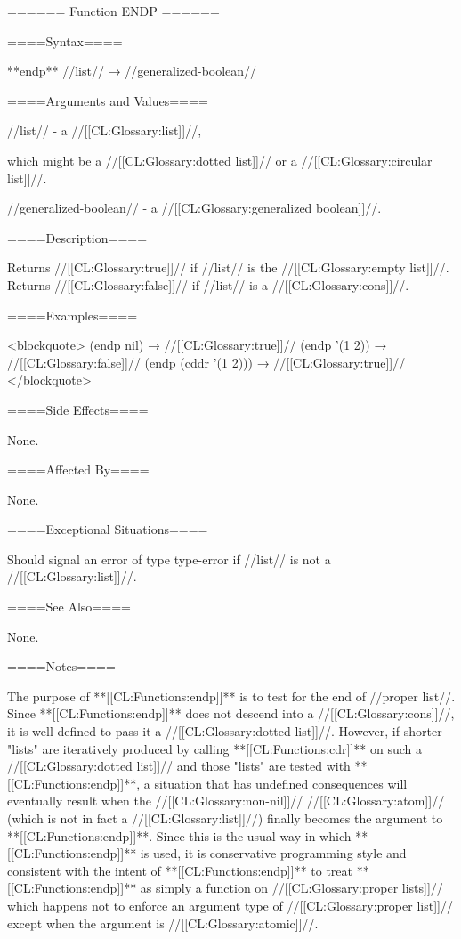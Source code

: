 ====== Function ENDP ======

====Syntax====

**endp** //list// → //generalized-boolean//

====Arguments and Values====

//list// - a //[[CL:Glossary:list]]//,

which might be a //[[CL:Glossary:dotted list]]// or a //[[CL:Glossary:circular list]]//.

//generalized-boolean// - a //[[CL:Glossary:generalized boolean]]//.

====Description====

Returns //[[CL:Glossary:true]]// if //list// is the //[[CL:Glossary:empty list]]//. Returns //[[CL:Glossary:false]]// if //list// is a //[[CL:Glossary:cons]]//.

====Examples====

<blockquote> (endp nil) → //[[CL:Glossary:true]]// (endp '(1 2)) → //[[CL:Glossary:false]]// (endp (cddr '(1 2))) → //[[CL:Glossary:true]]// </blockquote>

====Side Effects====

None.

====Affected By====

None.

====Exceptional Situations====

Should signal an error of type type-error if //list// is not a //[[CL:Glossary:list]]//.

====See Also====

None.

====Notes====

The purpose of **[[CL:Functions:endp]]** is to test for the end of //proper list//. Since **[[CL:Functions:endp]]** does not descend into a //[[CL:Glossary:cons]]//, it is well-defined to pass it a //[[CL:Glossary:dotted list]]//. However, if shorter "lists" are iteratively produced by calling **[[CL:Functions:cdr]]** on such a //[[CL:Glossary:dotted list]]// and those "lists" are tested with **[[CL:Functions:endp]]**, a situation that has undefined consequences will eventually result when the //[[CL:Glossary:non-nil]]// //[[CL:Glossary:atom]]// (which is not in fact a //[[CL:Glossary:list]]//) finally becomes the argument to **[[CL:Functions:endp]]**. Since this is the usual way in which **[[CL:Functions:endp]]** is used, it is conservative programming style and consistent with the intent of **[[CL:Functions:endp]]** to treat **[[CL:Functions:endp]]** as simply a function on //[[CL:Glossary:proper lists]]// which happens not to enforce an argument type of //[[CL:Glossary:proper list]]// except when the argument is //[[CL:Glossary:atomic]]//.


